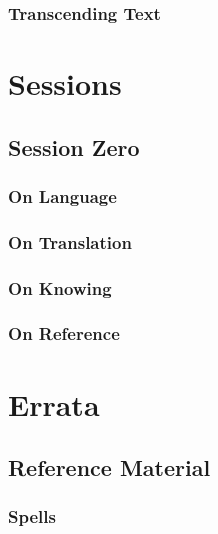 \documentclass[10pt,twoside,twocolumn,openany,nomultitoc]{book}
\begin{document}
\section{Transcending Text}
    \lipsum[6]

\part{Sessions}

\chapter{Session Zero}\vspace{6pt}

\begin{DndReadAloud}
  \lipsum[1]
\end{DndReadAloud}


\section{On Language}

\section{On Translation}
    \lipsum[1]
\section{On Knowing}
    \lipsum[2]
\section{On Reference}
    \lipsum[3]
    
\part{Errata}
\chapter{Reference Material}

\section{Spells}\vspace{6pt}
\end{document}
